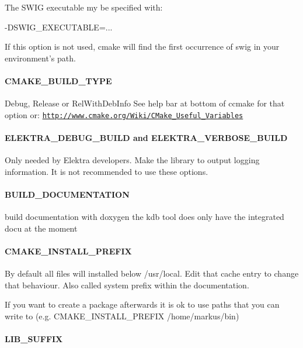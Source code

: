 The S\+W\+I\+G executable my be specified with\+: \begin{DoxyVerb}    -DSWIG_EXECUTABLE=...
\end{DoxyVerb}


If this option is not used, cmake will find the first occurrence of {\ttfamily swig} in your environment's path.

\paragraph*{C\+M\+A\+K\+E\+\_\+\+B\+U\+I\+L\+D\+\_\+\+T\+Y\+P\+E}

Debug, Release or Rel\+With\+Deb\+Info See help bar at bottom of ccmake for that option or\+: \href{http://www.cmake.org/Wiki/CMake_Useful_Variables}{\tt http\+://www.\+cmake.\+org/\+Wiki/\+C\+Make\+\_\+\+Useful\+\_\+\+Variables}

\paragraph*{E\+L\+E\+K\+T\+R\+A\+\_\+\+D\+E\+B\+U\+G\+\_\+\+B\+U\+I\+L\+D and E\+L\+E\+K\+T\+R\+A\+\_\+\+V\+E\+R\+B\+O\+S\+E\+\_\+\+B\+U\+I\+L\+D}

Only needed by Elektra developers. Make the library to output logging information. It is not recommended to use these options.

\paragraph*{B\+U\+I\+L\+D\+\_\+\+D\+O\+C\+U\+M\+E\+N\+T\+A\+T\+I\+O\+N}

build documentation with doxygen the kdb tool does only have the integrated docu at the moment

\paragraph*{C\+M\+A\+K\+E\+\_\+\+I\+N\+S\+T\+A\+L\+L\+\_\+\+P\+R\+E\+F\+I\+X}

By default all files will installed below /usr/local. Edit that cache entry to change that behaviour. Also called system prefix within the documentation.

If you want to create a package afterwards it is ok to use paths that you can write to (e.\+g. C\+M\+A\+K\+E\+\_\+\+I\+N\+S\+T\+A\+L\+L\+\_\+\+P\+R\+E\+F\+I\+X /home/markus/bin)

\paragraph*{L\+I\+B\+\_\+\+S\+U\+F\+F\+I\+X}


